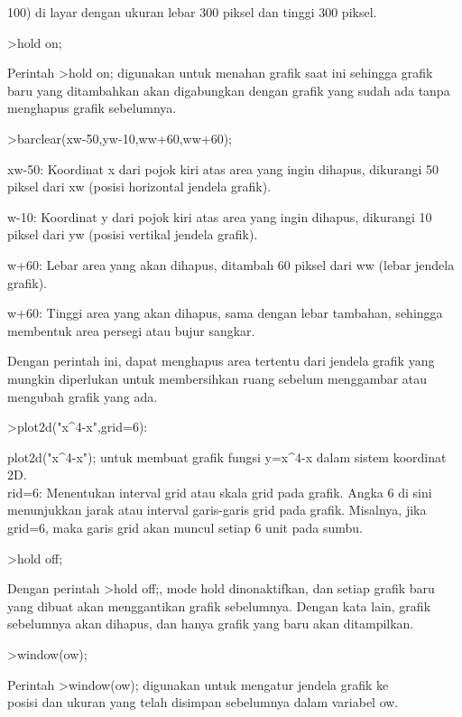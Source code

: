 \documentclass{article}
\begin{document}
\begin{eulernotebook}
\begin{eulercomment}
100) di layar dengan ukuran lebar 300 piksel dan tinggi 300 piksel.
\end{eulercomment}
\begin{eulerprompt}
>hold on;
\end{eulerprompt}
\begin{eulercomment}
Perintah \textgreater{}hold on; digunakan untuk menahan grafik saat ini sehingga
grafik baru yang ditambahkan akan digabungkan dengan grafik yang sudah
ada tanpa menghapus grafik sebelumnya.
\end{eulercomment}
\begin{eulerprompt}
>barclear(xw-50,yw-10,ww+60,ww+60);
\end{eulerprompt}
\begin{eulercomment}
xw-50: Koordinat x dari pojok kiri atas area yang ingin dihapus,
dikurangi 50 piksel dari xw (posisi horizontal jendela grafik).

w-10: Koordinat y dari pojok kiri atas area yang ingin dihapus,
dikurangi 10 piksel dari yw (posisi vertikal jendela grafik).

w+60: Lebar area yang akan dihapus, ditambah 60 piksel dari ww (lebar
jendela grafik).

w+60: Tinggi area yang akan dihapus, sama dengan lebar tambahan,
sehingga membentuk area persegi atau bujur sangkar.

Dengan perintah ini, dapat menghapus area tertentu dari jendela grafik
yang mungkin diperlukan untuk membersihkan ruang sebelum menggambar
atau mengubah grafik yang ada.
\end{eulercomment}
\begin{eulerprompt}
>plot2d("x^4-x",grid=6):
\end{eulerprompt}
\begin{eulercomment}
plot2d("x\textasciicircum{}4-x"); untuk membuat grafik fungsi y=x\textasciicircum{}4-x dalam sistem
koordinat 2D.\\
rid=6: Menentukan interval grid atau skala grid pada grafik. Angka 6
di sini menunjukkan jarak atau interval garis-garis grid pada grafik.
Misalnya, jika grid=6, maka garis grid akan muncul setiap 6 unit pada
sumbu.
\end{eulercomment}
\begin{eulerprompt}
>hold off;
\end{eulerprompt}
\begin{eulercomment}
Dengan perintah \textgreater{}hold off;, mode hold dinonaktifkan, dan setiap grafik
baru yang dibuat akan menggantikan grafik sebelumnya. Dengan kata
lain, grafik sebelumnya akan dihapus, dan hanya grafik yang baru akan
ditampilkan.
\end{eulercomment}
\begin{eulerprompt}
>window(ow);
\end{eulerprompt}
\begin{eulercomment}
Perintah \textgreater{}window(ow); digunakan untuk mengatur jendela grafik ke\\
posisi dan ukuran yang telah disimpan sebelumnya dalam variabel ow.


\end{eulercomment}
\end{eulernotebook}
\end{document}

